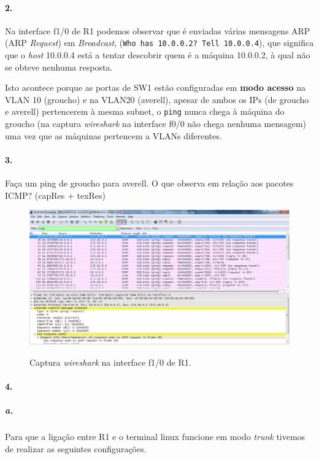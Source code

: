\paragraph{2.}
Na interface \textsf{f1/0} de \textsf{R1} podemos observar que é enviadas várias
mensagens ARP (ARP \emph{Request}) em \emph{Broadcast}, 
(\texttt{Who has 10.0.0.2? Tell 10.0.0.4}), que significa que o \emph{host} 
10.0.0.4 está a tentar descobrir quem é a máquina 10.0.0.2, à qual não se obteve
nenhuma resposta.

Isto acontece porque as portas de \textsf{SW1} estão configuradas em 
\textbf{modo acesso} na VLAN 10 (\textsf{groucho}) e na VLAN20  (\textsf{averell}), 
apesar de ambos os IPs (de \textsf{groucho} e \textsf{averell}) pertencerem à mesma subnet, o \texttt{ping} nunca chega à máquina do \textsf{groucho} (na captura 
\emph{wireshark} na interface \textsf{f0/0} não chega nenhuma mensagem) uma vez que 
as máquinas pertencem a VLANs diferentes.


\paragraph{3.}
 Faça um ping de groucho para averell. O que observa em relação aos pacotes ICMP? (capRes + texRes)
 
\begin{figure}[h]
\centering
\includegraphics[width=1\textwidth, height=0.38\textheight]{3_interface10_R1.png}
\label{fig:4-capturaWireshark}
\caption{Captura \emph{wireshark} na interface \textsf{f1/0} de \textsf{R1}.}
\end{figure}


\paragraph{4.}

\subparagraph{a.}
Para que a ligação entre \textsf{R1} e o terminal \textsf{linux} funcione em modo \emph{trunk} tivemos de realizar as seguintes configurações.

